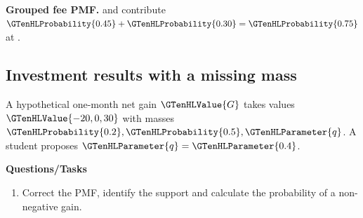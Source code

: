 \Needspace{6.8cm}
\par\noindent \begin{minipage}[t]{.485\linewidth}
\centering
{}
\par\small \textbf{Grouped fee PMF.}  and  contribute $\GTenHLProbability{0.45}+\GTenHLProbability{0.30}=\GTenHLProbability{0.75}$ at .
\end{minipage}\par\medskip


\subsection{Investment results with a missing mass}
\label{subsec:t2-c1-investment-results-with-a-missing-mass}
A hypothetical one-month net gain $\GTenHLValue{G}$ takes values $\GTenHLValue{-20,0,30}$  with masses $\GTenHLProbability{0.2},\GTenHLProbability{0.5},\GTenHLParameter{q}$. A student proposes $\GTenHLParameter{q}=\GTenHLParameter{0.4}$.

\textbf{Questions/Tasks}
\begin{enumerate}
\item Correct the PMF, identify the support and calculate the probability of a non-negative gain.
\end{enumerate}
